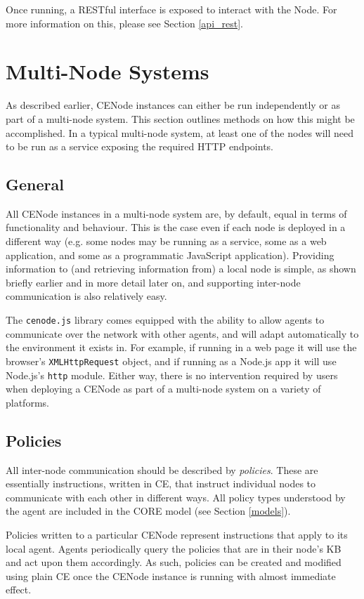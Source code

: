\documentclass{scrartcl}
\newcommand{\js}[1]{\texttt{#1}}
\begin{document}
Once running, a RESTful interface is exposed to interact with the Node. For more information on this, please see Section \ref{api_rest}.

\section{Multi-Node Systems}
As described earlier, CENode instances can either be run independently or as part of a multi-node system. This section outlines methods on how this might be accomplished. In a typical multi-node system, at least one of the nodes will need to be run as a service exposing the required HTTP endpoints.

\subsection{General}
All CENode instances in a multi-node system are, by default, equal in terms of functionality and behaviour. This is the case even if each node is deployed in a different way (e.g. some nodes may be running as a service, some as a web application, and some as a programmatic JavaScript application). Providing information to (and retrieving information from) a local node is simple, as shown briefly earlier and in more detail later on, and supporting inter-node communication is also relatively easy.

The \js{cenode.js} library comes equipped with the ability to allow agents to communicate over the network with other agents, and will adapt automatically to the environment it exists in. For example, if running in a web page it will use the browser's \js{XMLHttpRequest} object, and if running as a Node.js app it will use Node.js's \js{http} module. Either way, there is no intervention required by users when deploying a CENode as part of a multi-node system on a variety of platforms.


\subsection{Policies}
\label{policies}
All inter-node communication should be described by \textit{policies}. These are essentially instructions, written in CE, that instruct individual nodes to communicate with each other in different ways. All policy types understood by the agent are included in the CORE model (see Section \ref{models}).

Policies written to a particular CENode represent instructions that apply to its local agent. Agents periodically query the policies that are in their node's KB and act upon them accordingly. As such, policies can be created and modified using plain CE once the CENode instance is running with almost immediate effect.
\end{document}
